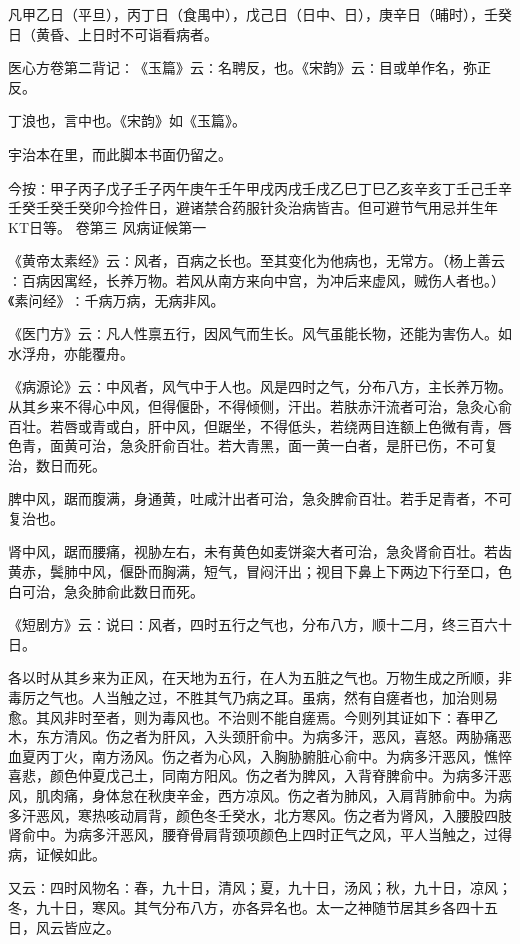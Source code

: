 \documentclass[a4paper,12pt,UTF8,twoside]{ctexbook}
\begin{document}
凡甲乙日（平旦），丙丁日（食禺中），戊己日（日中、日），庚辛日（晡时），壬癸日（黄昏、上日时不可诣看病者。

医心方卷第二背记∶《玉篇》云∶名聘反，也。《宋韵》云∶目或单作名，弥正反。

丁浪也，言中也。《宋韵》如《玉篇》。

宇治本在里，而此脚本书面仍留之。

今按∶甲子丙子戊子壬子丙午庚午壬午甲戌丙戌壬戌乙巳丁巳乙亥辛亥丁壬己壬辛壬癸壬癸壬癸卯今捡件日，避诸禁合药服针灸治病皆吉。但可避节气用忌并生年KT日等。
卷第三
风病证候第一

《黄帝太素经》云∶风者，百病之长也。至其变化为他病也，无常方。（杨上善云∶百病因寓经，长养万物。若风从南方来向中宫，为冲后来虚风，贼伤人者也。）《素问经》∶千病万病，无病非风。

《医门方》云∶凡人性禀五行，因风气而生长。风气虽能长物，还能为害伤人。如水浮舟，亦能覆舟。

《病源论》云∶中风者，风气中于人也。风是四时之气，分布八方，主长养万物。从其乡来不得心中风，但得偃卧，不得倾侧，汗出。若肤赤汗流者可治，急灸心俞百壮。若唇或青或白，肝中风，但踞坐，不得低头，若绕两目连额上色微有青，唇色青，面黄可治，急灸肝俞百壮。若大青黑，面一黄一白者，是肝已伤，不可复治，数日而死。

脾中风，踞而腹满，身通黄，吐咸汁出者可治，急灸脾俞百壮。若手足青者，不可复治也。

肾中风，踞而腰痛，视胁左右，未有黄色如麦饼粢大者可治，急灸肾俞百壮。若齿黄赤，鬓肺中风，偃卧而胸满，短气，冒闷汗出；视目下鼻上下两边下行至口，色白可治，急灸肺俞此数日而死。

《短剧方》云∶说曰∶风者，四时五行之气也，分布八方，顺十二月，终三百六十日。

各以时从其乡来为正风，在天地为五行，在人为五脏之气也。万物生成之所顺，非毒厉之气也。人当触之过，不胜其气乃病之耳。虽病，然有自瘥者也，加治则易愈。其风非时至者，则为毒风也。不治则不能自瘥焉。今则列其证如下∶春甲乙木，东方清风。伤之者为肝风，入头颈肝俞中。为病多汗，恶风，喜怒。两胁痛恶血夏丙丁火，南方汤风。伤之者为心风，入胸胁腑脏心俞中。为病多汗恶风，憔悴喜悲，颜色仲夏戊己土，同南方阳风。伤之者为脾风，入背脊脾俞中。为病多汗恶风，肌肉痛，身体怠在秋庚辛金，西方凉风。伤之者为肺风，入肩背肺俞中。为病多汗恶风，寒热咳动肩背，颜色冬壬癸水，北方寒风。伤之者为肾风，入腰股四肢肾俞中。为病多汗恶风，腰脊骨肩背颈项颜色上四时正气之风，平人当触之，过得病，证候如此。

又云∶四时风物名∶春，九十日，清风；夏，九十日，汤风；秋，九十日，凉风；冬，九十日，寒风。其气分布八方，亦各异名也。太一之神随节居其乡各四十五日，风云皆应之。
\end{document}
